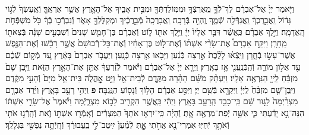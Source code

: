\documentclass[twoside, openany, parskip=half, 11pt]{book}
\begin{document}
\begin{footnotesize}
\begin{multicols}{2}
\\
וַיֹּ֤אמֶר יְיָ֙ אֶל־אַבְרָ֔ם לֶךְ־לְֿֿךָ֛ מֵֽאַרְצְֿךָ֥ וּמִמּֽוֹלַדְתְּֿךָ֖ וּמִבֵּ֣ית אָבִ֑יךָ אֶל־הָאָ֖רֶץ אֲשֶׁ֥ר אַרְאֶֽךָּ׃ וְֿאֶֽעֶשְׂךָ֙ לְֿג֣וֹי גָּד֔וֹל וַֽאֲבָ֣רֶכְךָ֔ וַֽאֲגַדְּֿלָ֖ה שְֿׁמֶ֑ךָ וֶֽהְיֵ֖ה בְּֿרָכָֽה׃ וַֽאֲבָרֲכָֽה֙ מְֿבָ֣רֲכֶ֔יךָ וּמְקַלֶּלְךָ֖ אָאֹ֑ר וְֿנִבְרְֿכ֣וּ בְֿךָ֔ כֹּ֖ל מִשְׁפְּֿחֹ֥ת הָֽאֲדָמָֽה׃  וַיֵּ֣לֶךְ אַבְרָ֗ם כַּֽאֲשֶׁ֨ר דִּבֶּ֤ר אֵלָיו֙ יְיָ֔ וַיֵּ֥לֶךְ אִתּ֖וֹ ל֑וֹט וְֿאַבְרָ֗ם בֶּן־חָמֵ֤שׁ שָׁנִים֙ וְֿשִׁבְעִ֣ים שָׁנָ֔ה בְּֿצֵאת֖וֹ מֵֽחָרָֽן׃ וַיִּקַּ֣ח אַבְרָם֩ אֶת־שָׂרַ֨י אִשְׁתּ֜וֹ וְֿאֶת־ל֣וֹט בֶּן־אָחִ֗יו וְֿאֶת־כׇּל־רְֿכוּשָׁם֙ אֲשֶׁ֣ר רָכָ֔שׁוּ וְֿאֶת־הַנֶּ֖פֶשׁ אֲשֶׁר־עָשׂ֣וּ בְֿחָ֑רָן וַיֵּֽצְֿא֗וּ לָלֶ֨כֶת֙ אַ֣רְצָה כְּֿנַ֔עַן וַיָּבֹ֖אוּ אַ֥רְצָה כְּֿנָֽעַן׃ וַיַּעֲבֹ֤ר אַבְרָם֙ בָּאָ֔רֶץ עַ֚ד מְֿק֣וֹם שְֿׁכֶ֔ם עַ֖ד אֵל֣וֹן מוֹרֶ֑ה וְֿהַֽכְּֿנַֽעֲנִ֖י אָ֥ז בָּאָֽרֶץ׃ וַיֵּרָ֤א יְיָ֙ אֶל־אַבְרָ֔ם וַיֹּ֕אמֶר לְֿזַ֨רְעֲךָ֔ אֶתֵּ֖ן אֶת־הָאָ֣רֶץ הַזֹּ֑את וַיִּ֤בֶן שָׁם֙ מִזְבֵּ֔חַ לַֽייָ֖ הַנִּרְאֶ֥ה אֵלָֽיו׃ וַיַּעְתֵּ֨ק מִשָּׁ֜ם הָהָ֗רָה מִקֶּ֛דֶם לְֿבֵית־אֵ֖ל וַיֵּ֣ט אׇׇׇׇׇׇׇׇׇׇׇׇָֽהֳלֹ֑ה בֵּית־אֵ֤ל מִיָּם֙ וְֿהָעַ֣י מִקֶּ֔דֶם וַיִּֽבֶן־שָׁ֤ם מִזְבֵּ֨חַ֙ לַֽיְיָ֔ וַיִּקְרָ֖א בְּֿשֵׁ֥ם יְיָ׃ וַיִּסַּ֣ע אַבְרָ֔ם הָל֥וֹךְ וְֿנָס֖וֹעַ הַנֶּֽגְבָּה׃ \textbf{פ}
 וַיְהִ֥י רָעָ֖ב בָּאָ֑רֶץ וַיֵּ֨רֶד אַבְרָ֤ם מִצְרַ֨יְמָה֙ לָג֣וּר שָׁ֔ם כִּֽי־כָבֵ֥ד הָֽרָעָ֖ב בָּאָֽרֶץ׃ וַיְהִ֕י כַּֽאֲשֶׁ֥ר הִקְרִ֖יב לָב֣וֹא מִצְרָ֑יְֿמָה וַיֹּ֨אמֶר֙ אֶל־שָׂרַ֣י אִשְׁתּ֔וֹ הִנֵּה־נָ֣א יָדַ֔עְתִּי כִּ֛י אִשָּׁ֥ה יְֿפַת־מַרְאֶ֖ה אׇׇׇׇׇׇָֽתְּ׃ וְֿהָיָ֗ה כִּֽי־יִרְא֤וּ אֹתָךְ֙ הַמִּצְרִ֔ים וְֿאָֽמְֿר֖וּ אִשְׁתּ֣וֹ זֹ֑את וְֿהָֽרְֿג֥וּ אֹתִ֖י וְֿאֹתָ֥ךְ יְֿחַיּֽוּ׃ אִמְרִי־נָ֖א אֲחֹ֣תִי אׇׇׇׇָ֑תְּ לְֿמַ֨עַן֙ יִֽיטַב־לִ֣י בַֽעֲבוּרֵ֔ךְ וְֿחָֽיְֿתָ֥ה נַפְשִׁ֖י בִּגְלָלֵֽךְ׃


\end{multicols}
\end{footnotesize}
\end{document}
